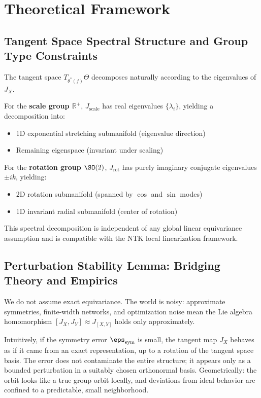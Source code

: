 \section{Theoretical Framework}
\label{sec:theory}

\subsection{Tangent Space Spectral Structure and Group Type Constraints}
\label{sec:spectral}

The tangent space $T_{\theta^*(f)}\Theta$ decomposes naturally according to the eigenvalues of $J_X$.

For the \textbf{scale group $\mathbb{R}^+$}, $J_{\mathrm{scale}}$ has real eigenvalues $\{\lambda_i\}$, yielding a decomposition into:
\begin{itemize}
    \item 1D exponential stretching submanifold (eigenvalue direction)
    \item Remaining eigenspace (invariant under scaling)
\end{itemize}

For the \textbf{rotation group $\SO(2)$}, $J_{\mathrm{rot}}$ has purely imaginary conjugate eigenvalues $\pm ik$, yielding:
\begin{itemize}
    \item 2D rotation submanifold (spanned by $\cos$ and $\sin$ modes)
    \item 1D invariant radial submanifold (center of rotation)
\end{itemize}

This spectral decomposition is independent of any global linear equivariance assumption and is compatible with the NTK local linearization framework.

\subsection{Perturbation Stability Lemma: Bridging Theory and Empirics}
\label{sec:perturbation}

We do not assume exact equivariance.
The world is noisy: approximate symmetries, finite-width networks, and optimization noise mean the Lie algebra homomorphism $[J_X, J_Y] \approx J_{[X,Y]}$ holds only approximately.

Intuitively, if the symmetry error $\eps_{\mathrm{sym}}$ is small, the tangent map $J_X$ behaves as if it came from an exact representation, up to a rotation of the tangent space basis.
The error does not contaminate the entire structure; it appears only as a bounded perturbation in a suitably chosen orthonormal basis.
Geometrically: the orbit looks like a true group orbit locally, and deviations from ideal behavior are confined to a predictable, small neighborhood.

